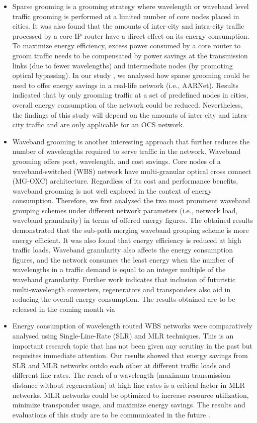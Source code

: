 \documentclass{article}
\begin{document}
\begin{itemize}
\item Sparse grooming is a grooming strategy where wavelength or waveband level traffic grooming is performed at a limited number of core nodes placed in cities. It was also found that the amounts of inter-city and intra-city traffic processed by a core IP router have a direct effect on its energy consumption. To maximize energy efficiency, excess power consumed by a core router to groom traffic needs to be compensated by power savings at the transmission links (due to fewer wavelengths) and intermediate nodes (by promoting optical bypassing). In our study \cite{Dharmaweera2010}, we analysed how sparse grooming could be used to offer energy savings in a real-life network (i.e., AARNet). Results indicated that by only grooming traffic at a set of predefined nodes in cities, overall energy consumption of the network could be reduced. Nevertheless, the findings of this study \cite{Dharmaweera2010} will depend on the amounts of inter-city and intra-city traffic and are only applicable for an OCS network.
\item Waveband grooming is another interesting approach that further reduces the number of wavelengths required to serve traffic in the network. Waveband grooming offers port, wavelength, and cost savings. Core nodes of a waveband-switched (WBS) network have multi-granular optical cross connect (MG-OXC) architecture. Regardless of its cost and performance benefits, waveband grooming is not well explored in the context of energy consumption. Therefore, we first analysed the two most prominent waveband grouping schemes under different network parameters (i.e., network load, waveband granularity) in terms of offered energy figures. The obtained results demonstrated that the sub-path merging waveband grouping scheme is more energy efficient. It was also found that energy efficiency is reduced at high traffic loads. Waveband granularity also affects the energy consumption figures, and the network consumes the least energy when the number of wavelengths in a traffic demand is equal to an integer multiple of the waveband granularity. Further work indicates that inclusion of futuristic multi-wavelength converters, regenerators and transponders also aid in reducing the overall energy consumption.
The results obtained are to be released in the coming month via \cite{Dharmaweera2012a} 
\item Energy consumption of wavelength routed WBS networks were comparatively analysed using Single-Line-Rate (SLR) and MLR techniques. This is an important research topic that has not been given any scrutiny in the past but requisites immediate attention. Our results showed that energy savings from SLR and MLR networks outdo each other at different traffic loads and different line rates. The reach of a wavelength (maximum transmission distance without regeneration) at high line rates is a critical factor in MLR networks. MLR networks could be optimized to increase resource utilization, minimize transponder usage, and maximize energy savings. The results and evaluations of this study are to be communicated in  the future \cite{Dharmaweera2012c}.
\end{itemize}
\end{document}
